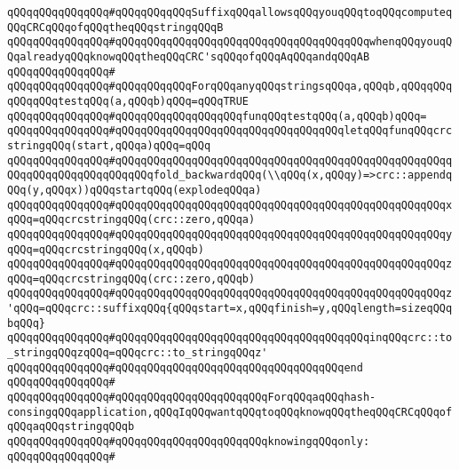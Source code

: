 \newline
\verb|qQQqqQQqqQQqqQQq#qQQqqQQqqQQqSuffixqQQqallowsqQQqyouqQQqtoqQQqcomputeqQQqCRCqQQqofqQQqtheqQQqstringqQQqB|\newline
\verb|qQQqqQQqqQQqqQQq#qQQqqQQqqQQqqQQqqQQqqQQqqQQqqQQqqQQqqQQqwhenqQQqyouqQQqalreadyqQQqknowqQQqtheqQQqCRC'sqQQqofqQQqAqQQqandqQQqAB|\newline
\verb|qQQqqQQqqQQqqQQq#|\newline
\verb|qQQqqQQqqQQqqQQq#qQQqqQQqqQQqForqQQqanyqQQqstringsqQQqa,qQQqb,qQQqqQQqqQQqqQQqtestqQQq(a,qQQqb)qQQq=qQQqTRUE|\newline
\verb|qQQqqQQqqQQqqQQq#qQQqqQQqqQQqqQQqqQQqfunqQQqtestqQQq(a,qQQqb)qQQq=|\newline
\verb|qQQqqQQqqQQqqQQq#qQQqqQQqqQQqqQQqqQQqqQQqqQQqqQQqqQQqletqQQqfunqQQqcrcstringqQQq(start,qQQqa)qQQq=qQQq|\newline
\verb|qQQqqQQqqQQqqQQq#qQQqqQQqqQQqqQQqqQQqqQQqqQQqqQQqqQQqqQQqqQQqqQQqqQQqqQQqqQQqqQQqqQQqqQQqqQQqfold_backwardqQQq(\\qQQq(x,qQQqy)=>crc::appendqQQq(y,qQQqx))qQQqstartqQQq(explodeqQQqa)|\newline
\verb|qQQqqQQqqQQqqQQq#qQQqqQQqqQQqqQQqqQQqqQQqqQQqqQQqqQQqqQQqqQQqqQQqqQQqxqQQq=qQQqcrcstringqQQq(crc::zero,qQQqa)|\newline
\verb|qQQqqQQqqQQqqQQq#qQQqqQQqqQQqqQQqqQQqqQQqqQQqqQQqqQQqqQQqqQQqqQQqqQQqyqQQq=qQQqcrcstringqQQq(x,qQQqb)|\newline
\verb|qQQqqQQqqQQqqQQq#qQQqqQQqqQQqqQQqqQQqqQQqqQQqqQQqqQQqqQQqqQQqqQQqqQQqzqQQq=qQQqcrcstringqQQq(crc::zero,qQQqb)|\newline
\verb|qQQqqQQqqQQqqQQq#qQQqqQQqqQQqqQQqqQQqqQQqqQQqqQQqqQQqqQQqqQQqqQQqqQQqz'qQQq=qQQqcrc::suffixqQQq{qQQqstart=x,qQQqfinish=y,qQQqlength=sizeqQQqbqQQq}|\newline
\verb|qQQqqQQqqQQqqQQq#qQQqqQQqqQQqqQQqqQQqqQQqqQQqqQQqqQQqqQQqinqQQqcrc::to_stringqQQqzqQQq=qQQqcrc::to_stringqQQqz'|\newline
\verb|qQQqqQQqqQQqqQQq#qQQqqQQqqQQqqQQqqQQqqQQqqQQqqQQqqQQqend|\newline
\verb|qQQqqQQqqQQqqQQq#|\newline
\verb|qQQqqQQqqQQqqQQq#qQQqqQQqqQQqqQQqqQQqqQQqForqQQqaqQQqhash-consingqQQqapplication,qQQqIqQQqwantqQQqtoqQQqknowqQQqtheqQQqCRCqQQqofqQQqaqQQqstringqQQqb|\newline
\verb|qQQqqQQqqQQqqQQq#qQQqqQQqqQQqqQQqqQQqqQQqknowingqQQqonly:|\newline
\verb|qQQqqQQqqQQqqQQq#|\newline
